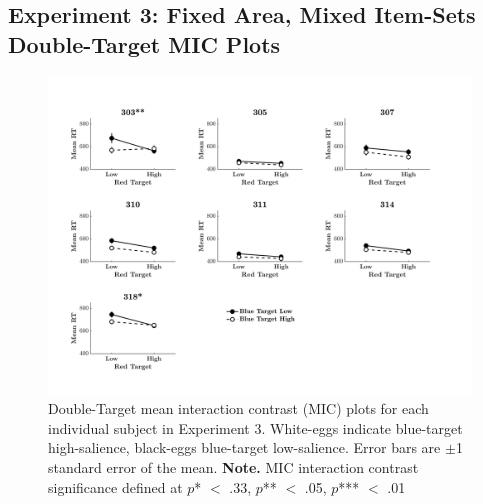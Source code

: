 \subsection{Experiment 3: Fixed Area, Mixed Item-Sets Double-Target MIC Plots}
\begin{figure}[htb]
\begin{center}
\includegraphics[width=\linewidth]{Figures/Appendix/FIG29PNG.png}
\caption{Double-Target mean interaction contrast (MIC) plots for each individual subject in Experiment 3. White-eggs indicate blue-target high-salience, black-eggs blue-target low-salience. Error bars are $\pm$1 standard error of the mean. \newline
\textbf{Note.} MIC interaction contrast significance defined at $p$* $<$ .33, $p$** $<$ .05, $p$*** $<$ .01}
\label{fig:Indiv_MIC_AB_Ex3}
\end{center}
\end{figure}
\newpage

